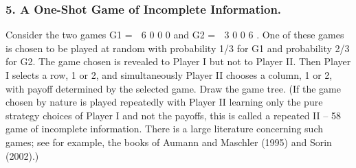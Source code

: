 \subsubsection{5. A One-Shot Game of Incomplete Information.} Consider the two games
G1 =
 6 0
0 0
and G2 =
 3 0
0 6
. One of these games is chosen to be played at random
with probability 1/3 for G1 and probability 2/3 for G2. The game chosen is revealed to
Player I but not to Player II. Then Player I selects a row, 1 or 2, and simultaneously
Player II chooses a column, 1 or 2, with payoff determined by the selected game. Draw
the game tree. (If the game chosen by nature is played repeatedly with Player II learning
only the pure strategy choices of Player I and not the payoffs, this is called a repeated
II – 58
game of incomplete information. There is a large literature concerning such games; see for
example, the books of Aumann and Maschler (1995) and Sorin (2002).)
